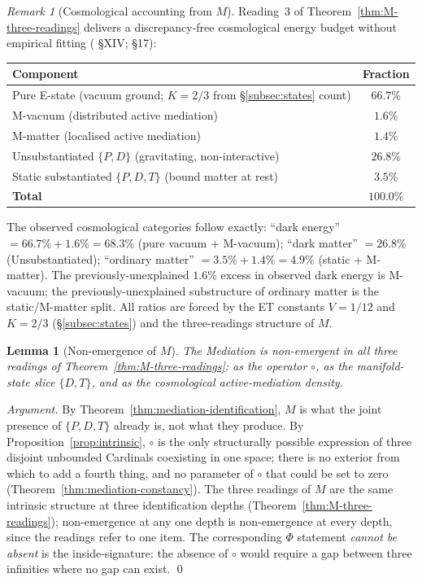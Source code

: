 \documentclass[11pt,a4paper]{article}
\newtheorem{lemma}[theorem]{Lemma}
\theoremstyle{definition}
\theoremstyle{remark}
\newtheorem{remark}[theorem]{Remark}
\begin{document}
\begin{remark}[Cosmological accounting from $M$]\label{rem:cosmological-accounting}
Reading~3 of Theorem~\ref{thm:M-three-readings} delivers a discrepancy-free cosmological energy budget without empirical fitting (\cite{Muller-IntroductoryPaper} \S XIV; \cite{Muller-IncoherencePaper} \S 17):
\begin{center}
\begin{tabular}{@{}l c@{}}
\toprule
Component & Fraction\\
\midrule
Pure E-state (vacuum ground; $K = 2/3$ from \S\ref{subsec:states} count) & $66.7\%$\\
M-vacuum (distributed active mediation) & $1.6\%$\\
M-matter (localised active mediation) & $1.4\%$\\
Unsubstantiated $\{P,D\}$ (gravitating, non-interactive) & $26.8\%$\\
Static substantiated $\{P,D,T\}$ (bound matter at rest) & $3.5\%$\\
\midrule
\textbf{Total} & $\mathbf{100.0\%}$\\
\bottomrule
\end{tabular}
\end{center}
The observed cosmological categories follow exactly: ``dark energy'' $= 66.7\% + 1.6\% = 68.3\%$ (pure vacuum + M-vacuum); ``dark matter'' $= 26.8\%$ (Unsubstantiated); ``ordinary matter'' $= 3.5\% + 1.4\% = 4.9\%$ (static + M-matter). The previously-unexplained $1.6\%$ excess in observed dark energy is M-vacuum; the previously-unexplained substructure of ordinary matter is the static/M-matter split. All ratios are forced by the ET constants $V = 1/12$ and $K = 2/3$ (\S\ref{subsec:states}) and the three-readings structure of $M$.
\end{remark}

\begin{lemma}[Non-emergence of $M$]\label{lem:emergent-M}
The Mediation is non-emergent in all three readings of Theorem~\ref{thm:M-three-readings}: as the operator $\circ$, as the manifold-state slice $\{D,T\}$, and as the cosmological active-mediation density.
\end{lemma}

\begin{proof}[Argument]
By Theorem~\ref{thm:mediation-identification}, $M$ is what the joint presence of $\{P,D,T\}$ already is, not what they produce. By Proposition~\ref{prop:intrinsic}, $\circ$ is the only structurally possible expression of three disjoint unbounded Cardinals coexisting in one space; there is no exterior from which to add a fourth thing, and no parameter of $\circ$ that could be set to zero (Theorem~\ref{thm:mediation-constancy}). The three readings of $M$ are the same intrinsic structure at three identification depths (Theorem~\ref{thm:M-three-readings}); non-emergence at any one depth is non-emergence at every depth, since the readings refer to one item. The corresponding $\Phi$ statement \emph{cannot be absent} is the inside-signature: the absence of $\circ$ would require a gap between three infinities where no gap can exist. \qed
\end{proof}
\end{document}

